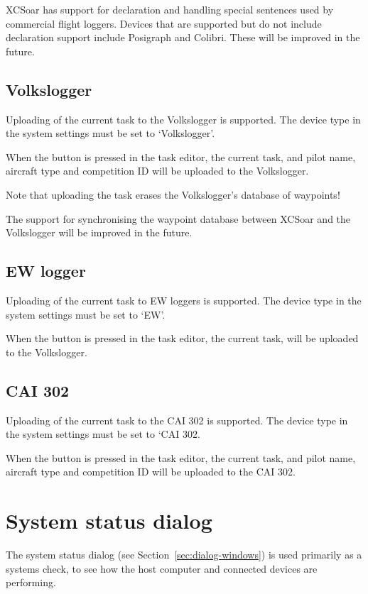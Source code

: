 \documentclass[a4paper,12pt]{refrep}
\begin{document}
XCSoar has support for declaration and handling special sentences used
by commercial flight loggers.  Devices that are supported but do not
include declaration support include Posigraph and Colibri.  These will
be improved in the future.

\subsection*{Volkslogger}

Uploading of the current task to the Volkslogger is supported.  The
device type in the system settings must be set to `Volkslogger'.

When the  button is pressed in the task editor, the
current task, and pilot name, aircraft type and competition ID will be
uploaded to the Volkslogger.

Note that uploading the task erases the Volkslogger's database of
waypoints!

The support for synchronising the waypoint database between XCSoar and
the Volkslogger will be improved in the future. 

\subsection*{EW logger}

Uploading of the current task to EW loggers is supported.  The
device type in the system settings must be set to `EW'.

When the  button is pressed in the task editor, the
current task, will be uploaded to the Volkslogger.

\subsection*{CAI 302}

Uploading of the current task to the CAI 302 is supported.  The device
type in the system settings must be set to `CAI 302.

When the  button is pressed in the task editor, the
current task, and pilot name, aircraft type and competition ID will be
uploaded to the CAI 302.


\section{System status dialog}\label{sec:system-status-dialog}

The system status dialog (see Section~\ref{sec:dialog-windows}) is
used primarily as a systems check, to see how the host computer and
connected devices are performing.
\end{document}
